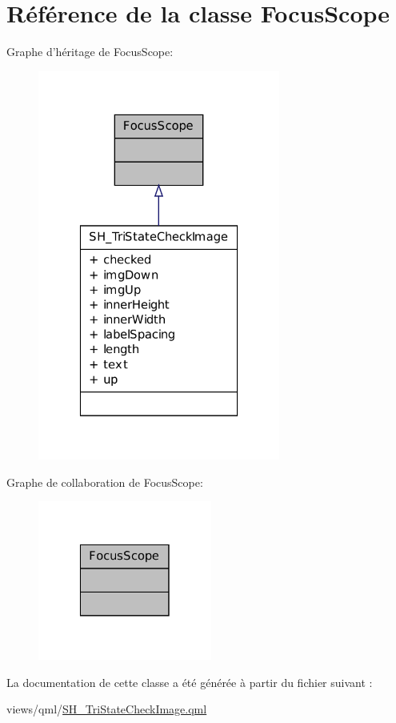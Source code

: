 \hypertarget{classFocusScope}{\section{Référence de la classe Focus\-Scope}
\label{classFocusScope}
}


Graphe d'héritage de Focus\-Scope\-:
\nopagebreak
\begin{figure}[H]
\begin{center}
\leavevmode
\includegraphics[width=226pt]{classFocusScope__inherit__graph}
\end{center}
\end{figure}


Graphe de collaboration de Focus\-Scope\-:
\nopagebreak
\begin{figure}[H]
\begin{center}
\leavevmode
\includegraphics[width=162pt]{classFocusScope__coll__graph}
\end{center}
\end{figure}


La documentation de cette classe a été générée à partir du fichier suivant \-:\begin{DoxyCompactItemize}
\item 
views/qml/\hyperlink{SH__TriStateCheckImage_8qml}{S\-H\-\_\-\-Tri\-State\-Check\-Image.\-qml}\end{DoxyCompactItemize}

